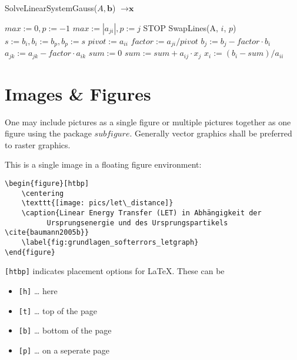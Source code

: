 \begin{algorithm}
\caption{SolveLinearSystemGauss($A, \textbf{b}$) $\rightarrow \textbf{x}$}
\label{alg:gauss}
\begin{algorithmic}
{\small
{}
  \STATE $max := 0, p := -1$
  \STATE
      \STATE $max := |a_{ji}|, p := j$
    \ENDIF
  \ENDFOR
  \STATE
    \STATE STOP 
  \ENDIF
  \STATE
    \STATE SwapLines(A, $i$, $p$)
    \STATE $s := b_i, b_i := b_p, b_p := s$
  \ENDIF
  \STATE
  \STATE $pivot := a_{ii}$
  \STATE
    \STATE $factor := a_{ji} / pivot$
    \STATE $b_j := b_j - factor \cdot b_i$
      \STATE $a_{jk} := a_{jk} - factor \cdot a_{ik}$
    \ENDFOR
  \ENDFOR
\ENDFOR
\STATE
{}
  \STATE $sum := 0$
    \STATE $sum := sum + a_{ij} \cdot x_j$
  \ENDFOR
  \STATE $x_i := (b_i - sum) / a_{ii}$
\ENDFOR
}
\end{algorithmic}
\end{algorithm}
\clearpage


\section{Images \& Figures}
\label{sec:images}

One may include pictures as a single figure or multiple pictures together as one figure using the package $subfigure$.
Generally vector graphics shall be preferred to raster graphics.

This is a single image in a floating figure environment:
\begin{verbatim}
\begin{figure}[htbp]
	\centering
	\texttt{[image: pics/let\_distance]}
	\caption{Linear Energy Transfer (LET) in Abhängigkeit der
          Ursprungsenergie und des Ursprungspartikels \cite{baumann2005b}}
	\label{fig:grundlagen_softerrors_letgraph}
\end{figure}
\end{verbatim}

\verb$[htbp]$ indicates placement options for \LaTeX{}. These can be 
\begin{itemize}
	\item \verb$[h]$ \dots{} here
	\item \verb$[t]$ \dots{} top of the page
	\item \verb$[b]$ \dots{} bottom of the page
	\item \verb$[p]$ \dots{} on a seperate page
\end{itemize}

